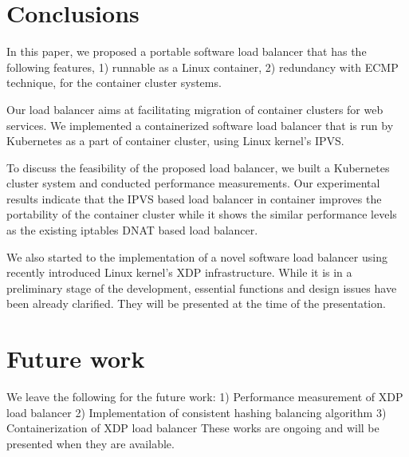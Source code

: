 \section{Conclusions}\label{Conclusions}

In this paper, we proposed a portable software load balancer that has the following features, 1) runnable as a Linux container, 2) redundancy with ECMP technique,  for the container cluster systems.

Our load balancer aims at facilitating migration of container clusters for web services.
We implemented a containerized software load balancer that is run by Kubernetes as a part of container cluster,
using Linux kernel's IPVS.

To discuss the feasibility of the proposed load balancer, we built
a Kubernetes cluster system and conducted performance measurements.
Our experimental results indicate that the IPVS based load balancer in container improves the portability of
the container cluster while it shows the similar performance levels as the existing iptables DNAT based load balancer.

We also started to the implementation of a novel software load balancer using recently introduced Linux kernel's XDP infrastructure.
While it is in a preliminary stage of the development, essential functions and design issues have been already clarified.
They will be presented at the time of the presentation.

\section{Future work}\label{Future work}

We leave the following for the future work:
1) Performance measurement of XDP load balancer
2) Implementation of consistent hashing balancing algorithm
3) Containerization of XDP load balancer
These works are ongoing and will be presented when they are available.

